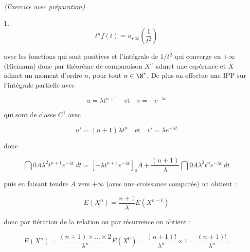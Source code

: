 \documentclass[11pt]{article}%
\begin{document}
\begin{exercice}{\it (Exercice avec préparation)}
\begin{noliste}{1.}
\[
 t^{n} f(t) = o_{ + \infty } \left( \frac{ 1 }{ t^{2} } \right) 
\]

 avec les fonctions qui sont positives et l'intégrale de $1/t^{2}$ qui
converge en $ + \infty$ (Riemann) donc par théorème de comparaison
$X^{n}$ admet une espérance et $X$ admet un moment d'ordre $n$, pour
tout $n \in \N^*$. De plus on effectue une IPP sur l'intégrale
partielle avec
 
\[
 u = \lambda t^{n + 1} \ \ \ \text{ et } \ \ \ v = - e^{ - \lambda t } 
\]

 qui sont de classe $C^{1}$ avec
 
\[
 u' = (n + 1) \lambda t^{n} \ \ \ \text{ et } \ \ \ v' = \lambda e^{ -
\lambda t } 
\]

 donc
 
\[
 \dint{0}{A} \lambda^{2} t^{n + 1} e^{ - \lambda t } \ dt = \left[ -
\lambda t^{n + 1} e^{ - \lambda t } \right]_{0}{A} + \frac{ (n + 1) }{
\lambda } \dint{0}{A} \lambda^{2} t^{n} e^{ - \lambda t } \ dt 
\]

 puis en faisant tendre $A$ vers $ + \infty$ (avec une croissance
comparée) on obtient : 
 
\[
 E ( X^{n} ) = \frac{ n + 1 }{ \lambda } E ( X^{n-1} ) 
\]

 donc par itération de la relation ou par récurrence on obtient : 
 
\[
 E ( X^{n} ) = \frac{ (n + 1) \times \dots \times 2 }{ \lambda^{n} } E
( X^{0} ) = \frac{ (n + 1)! }{ \lambda^{n} } \times 1 = \frac{ (n + 1)!
}{ \lambda^{n} }. 
\]


 \end{noliste}
 \end{exercice}

 \newpage
\end{document}
